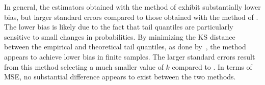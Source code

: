 \documentclass[lineno]{biometrika}
\begin{document}
In general, the estimators obtained with the method of \citet{danielsson:Ergun:deHaan:deVries:2016} exhibit substantially lower bias,  but larger standard errors compared to those obtained with the method of \citet{clauset:shalizi:newman:2009}. The lower bias is likely due to the fact that tail quantiles are particularly sensitive to small changes in probabilities. By minimizing the KS distance between the empirical and theoretical tail quantiles, as done by~\citet{danielsson:Ergun:deHaan:deVries:2016}, the method  appears to achieve lower bias in finite samples. The larger standard errors result from this method selecting a much smaller value of $k$ compared to \citet{clauset:shalizi:newman:2009}. In terms of MSE, no substantial difference appears to exist between the two methods.
\end{document}

